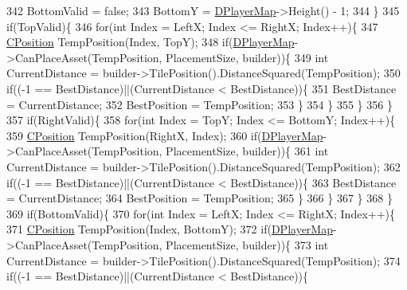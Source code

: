 \begin{DoxyCode}
342             BottomValid = \textcolor{keyword}{false};
343             BottomY = \hyperlink{classCPlayerData_a452163191cd4603e1e38dd8d4bb9691c}{DPlayerMap}->Height() - 1;
344         \}
345         \textcolor{keywordflow}{if}(TopValid)\{
346            \textcolor{keywordflow}{for}(\textcolor{keywordtype}{int} Index = LeftX; Index <= RightX; Index++)\{
347                 \hyperlink{classCPosition}{CPosition} TempPosition(Index, TopY);
348                 \textcolor{keywordflow}{if}(\hyperlink{classCPlayerData_a452163191cd4603e1e38dd8d4bb9691c}{DPlayerMap}->CanPlaceAsset(TempPosition, PlacementSize, builder))\{
349                     \textcolor{keywordtype}{int} CurrentDistance = builder->TilePosition().DistanceSquared(TempPosition);
350                     \textcolor{keywordflow}{if}((-1 == BestDistance)||(CurrentDistance < BestDistance))\{
351                         BestDistance = CurrentDistance;
352                         BestPosition = TempPosition;
353                     \}
354                 \}
355             \}
356         \}
357         \textcolor{keywordflow}{if}(RightValid)\{
358            \textcolor{keywordflow}{for}(\textcolor{keywordtype}{int} Index = TopY; Index <= BottomY; Index++)\{
359                 \hyperlink{classCPosition}{CPosition} TempPosition(RightX, Index);
360                 \textcolor{keywordflow}{if}(\hyperlink{classCPlayerData_a452163191cd4603e1e38dd8d4bb9691c}{DPlayerMap}->CanPlaceAsset(TempPosition, PlacementSize, builder))\{
361                     \textcolor{keywordtype}{int} CurrentDistance = builder->TilePosition().DistanceSquared(TempPosition);
362                     \textcolor{keywordflow}{if}((-1 == BestDistance)||(CurrentDistance < BestDistance))\{
363                         BestDistance = CurrentDistance;
364                         BestPosition = TempPosition;
365                     \}
366                 \}
367             \}
368         \}
369         \textcolor{keywordflow}{if}(BottomValid)\{
370            \textcolor{keywordflow}{for}(\textcolor{keywordtype}{int} Index = LeftX; Index <= RightX; Index++)\{
371                 \hyperlink{classCPosition}{CPosition} TempPosition(Index, BottomY);
372                 \textcolor{keywordflow}{if}(\hyperlink{classCPlayerData_a452163191cd4603e1e38dd8d4bb9691c}{DPlayerMap}->CanPlaceAsset(TempPosition, PlacementSize, builder))\{
373                     \textcolor{keywordtype}{int} CurrentDistance = builder->TilePosition().DistanceSquared(TempPosition);
374                     \textcolor{keywordflow}{if}((-1 == BestDistance)||(CurrentDistance < BestDistance))\{

\end{DoxyCode}
